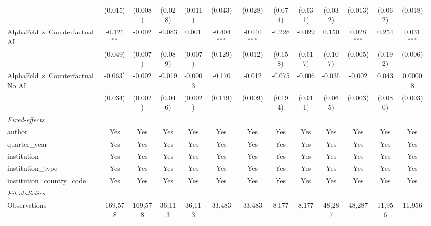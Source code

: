 \begin{tabular}{lcccccccccccc}
                                            & (0.015)       & (0.008) & (0.028) & (0.011) & (0.043)        & (0.028)        & (0.074) & (0.031) & (0.032) & (0.013)       & (0.062) & (0.018)\\   
   AlphaFold $\times$ Counterfactual AI     & -0.123$^{**}$ & -0.002  & -0.083  & 0.001   & -0.404$^{***}$ & -0.040$^{***}$ & -0.228  & -0.029  & 0.150   & 0.028$^{***}$ & 0.254   & 0.031$^{***}$\\   
                                            & (0.049)       & (0.007) & (0.089) & (0.007) & (0.129)        & (0.012)        & (0.158) & (0.017) & (0.107) & (0.005)       & (0.192) & (0.006)\\   
   AlphaFold $\times$ Counterfactual No AI  & -0.063$^{*}$  & -0.002  & -0.019  & -0.0003 & -0.170         & -0.012         & -0.075  & -0.006  & -0.035  & -0.002        & 0.043   & 0.00008\\   
                                            & (0.034)       & (0.002) & (0.046) & (0.002) & (0.119)        & (0.009)        & (0.194) & (0.011) & (0.065) & (0.003)       & (0.080) & (0.003)\\   
   \midrule
   \emph{Fixed-effects}\\
   author                                   & Yes           & Yes     & Yes     & Yes     & Yes            & Yes            & Yes     & Yes     & Yes     & Yes           & Yes     & Yes\\  
   quarter\_year                            & Yes           & Yes     & Yes     & Yes     & Yes            & Yes            & Yes     & Yes     & Yes     & Yes           & Yes     & Yes\\  
   institution                              & Yes           & Yes     & Yes     & Yes     & Yes            & Yes            & Yes     & Yes     & Yes     & Yes           & Yes     & Yes\\  
   institution\_type                        & Yes           & Yes     & Yes     & Yes     & Yes            & Yes            & Yes     & Yes     & Yes     & Yes           & Yes     & Yes\\  
   institution\_country\_code               & Yes           & Yes     & Yes     & Yes     & Yes            & Yes            & Yes     & Yes     & Yes     & Yes           & Yes     & Yes\\  
   \midrule
   \emph{Fit statistics}\\
   Observations                             & 169,578       & 169,578 & 36,113  & 36,113  & 33,483         & 33,483         & 8,177   & 8,177   & 48,287  & 48,287        & 11,956  & 11,956\\  

\end{tabular}
